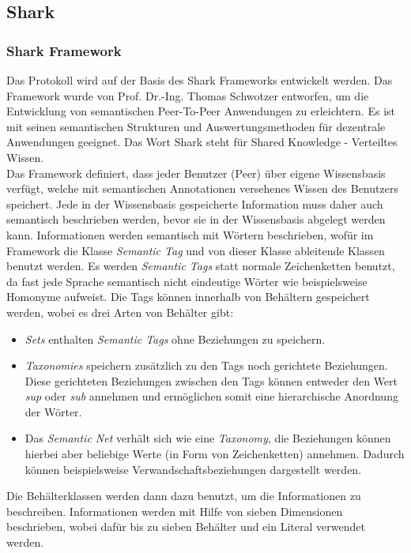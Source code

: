 \subsection{Shark}
\subsubsection{Shark Framework}
Das Protokoll wird auf der Basis des Shark Frameworks entwickelt werden. Das Framework wurde von Prof. Dr.-Ing. Thomas Schwotzer entworfen, um die Entwicklung von semantischen Peer-To-Peer Anwendungen zu erleichtern. Es ist mit seinen semantischen Strukturen und Auswertungsmethoden für dezentrale Anwendungen geeignet. Das Wort Shark steht für Shared Knowledge - Verteiltes Wissen.
\\Das Framework definiert, dass jeder Benutzer (Peer) über eigene Wissensbasis verfügt, welche mit semantischen Annotationen versehenes Wissen des Benutzers speichert. Jede in der Wissensbasis gespeicherte Information muss daher auch semantisch beschrieben werden, bevor sie in der Wissensbasis abgelegt werden kann. Informationen werden semantisch mit Wörtern beschrieben, wofür im Framework die Klasse \textit{Semantic Tag} und von dieser Klasse ableitende Klassen benutzt werden. Es werden \textit{Semantic Tags} statt normale Zeichenketten benutzt, da fast jede Sprache semantisch nicht eindeutige Wörter wie beispielsweise Homonyme aufweist. Die Tags können innerhalb von Behältern gespeichert werden, wobei es drei Arten von Behälter gibt:
\begin{itemize}
	\item \textit{Sets} enthalten \textit{Semantic Tags} ohne Beziehungen zu speichern.
	\item \textit{Taxonomies} speichern zusätzlich zu den Tags noch gerichtete Beziehungen. Diese gerichteten Beziehungen zwischen den Tags können entweder den Wert \textit{sup} oder \textit{sub} annehmen und ermöglichen somit eine hierarchische Anordnung der Wörter.
	\item Das \textit{Semantic Net} verhält sich wie eine \textit{Taxonomy}, die Beziehungen können hierbei aber beliebige Werte (in Form von Zeichenketten) annehmen. Dadurch können beispielsweise Verwandschaftsbeziehungen dargestellt werden.
\end{itemize}
Die Behälterklassen werden dann dazu benutzt, um die Informationen zu beschreiben. Informationen werden mit Hilfe von sieben Dimensionen beschrieben, wobei dafür bis zu sieben Behälter und ein Literal verwendet werden.
